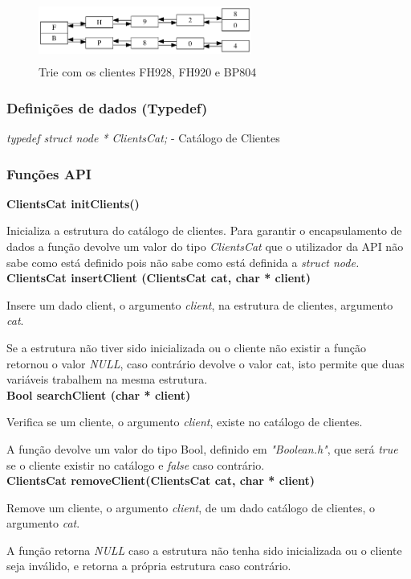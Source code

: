 \documentclass[10pt] {article}
\begin{document}
\begin{figure}[ht!]
\centering
\includegraphics[width=70mm, height=20mm]{trie.png}
\caption{Trie com os clientes FH928, FH920 e BP804}
\end{figure}

\subsubsection{Definições de dados (Typedef)}
\emph{typedef struct node * ClientsCat;} - Catálogo de Clientes

\subsubsection{Funções API}

\noindent\textbf{ClientsCat initClients()}
\par
Inicializa a estrutura do catálogo de clientes.  Para garantir o encapsulamento de dados a função devolve um valor do tipo \emph{ClientsCat} que o utilizador da API
não sabe como está definido pois não sabe como está definida a \emph{struct node.} \\

\noindent\textbf{ClientsCat insertClient (ClientsCat cat, char * client)}
\par Insere um dado client, o argumento \emph{client}, na estrutura de clientes, argumento \emph{cat}.
\par Se a estrutura não tiver sido inicializada ou o cliente não existir a função retornou o valor \emph{NULL},
caso contrário devolve o valor cat, isto permite que duas variáveis trabalhem na mesma estrutura. \\

\noindent \textbf {Bool searchClient (char * client)}
\par Verifica se um cliente, o argumento \emph{client}, existe no catálogo de clientes.
\par A função devolve um valor do tipo Bool, definido em \emph{"Boolean.h"}, que será \emph{true} se o
cliente existir no catálogo e \emph{false} caso contrário. \\

\noindent \textbf{ClientsCat removeClient(ClientsCat cat, char * client)}
\par Remove um cliente, o argumento \emph{client}, de um dado catálogo de clientes, o argumento \emph{cat}.
\par A função retorna \emph{NULL} caso a estrutura não tenha sido inicializada ou o cliente seja inválido, e
retorna a própria estrutura caso contrário. \\
\end{document}

